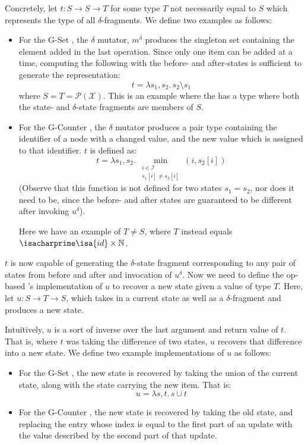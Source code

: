 Concretely, let $t : S \to S \to T$ for some type $T$ not necessarily equal to
$S$ which represents the type of all $\delta$-fragments. We define two examples
as follows:
\begin{itemize}
  \item For the G-Set \CRDT, the $\delta$ mutator, $m^\delta$ produces the
    singleton set containing the element added in the last operation. Since only
    one item can be added at a time, computing the following with the before-
    and after-states is sufficient to generate the representation:
    \[
      t = \lambda s_1, s_2.\, s_2 \setminus s_1
    \]
    where $S = T = \mathcal{P}(\mathcal{X})$. This is an example where the \CRDT
    has a type where both the state- and $\delta$-state fragments are members of
    $S$.
  \item For the G-Counter \CRDT, the $\delta$ mutator produces a pair
    type containing the identifier of a node with a changed value, and the new
    value which is assigned to that identifier. $t$ is defined as:
    \[
      t = \lambda s_1, s_2.\, \min_{\substack{i \in \mathcal{I} \\ s_1[i] \ne
        s_2[i]}} (i, s_2[i])
    \]
    (Observe that this function is not defined for two states $s_1 = s_2$, nor
    does it need to be, since the before- and after states are guaranteed to be
    different after invoking $u^\delta$).

    Here we have an example of $T \ne S$, where $T$ instead equals
    $\isacharprime\isa{id} \times \mathbb{N}$.
\end{itemize}

$t$ is now capable of generating the $\delta$-state fragment corresponding to
any pair of states from before and after and invocation of $u^\delta$. Now we
need to define the op-based \CRDT's implementation of $u$ to recover a new state
given a value of type $T$. Here, let $u : S \to T \to S$, which takes in a
current state as well as a $\delta$-fragment and produces a new state.

Intuitively, $u$ is a sort of inverse over the last argument and return value of
$t$. That is, where $t$ was taking the difference of two states, $u$ recovers
that difference into a new state. We define two example implementations of $u$
as follows:
\begin{itemize}
  \item For the G-Set \CRDT, the new state is recovered by taking the union of
    the current state, along with the state carrying the new item. That is:
    \[
      u = \lambda s, t.\, s \cup t
    \]
  \item For the G-Counter \CRDT, the new state is recovered by taking the old
    state, and replacing the entry whose index is equal to the first part of an
    update with the value described by the second part of that update.
\end{itemize}

